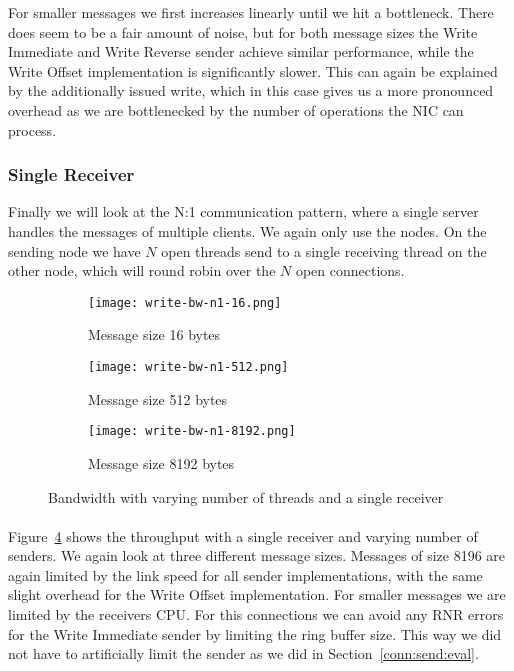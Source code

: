 For smaller messages we  first increases linearly until we hit a bottleneck. There does seem to be a fair amount of noise,
but for both message sizes the Write Immediate and Write Reverse sender achieve similar performance, while the Write Offset
implementation is significantly slower. This can again be explained by the additionally issued write, which in this case 
gives us a more pronounced overhead as we are bottlenecked by the number of operations the NIC can process.




\subsubsection{Single Receiver}
Finally we will look at the N:1 communication pattern, where a single server handles the messages of multiple clients. 
We again only use the nodes. On the sending node we have $N$ open threads send to a single receiving thread on the other node,
which will round robin over the $N$ open connections. 

\begin{figure}[]
  \centering
\begin{subfigure}[b]{0.49\textwidth}
  \centering
  \texttt{[image: write-bw-n1-16.png]}
  \caption{Message size 16 bytes}
  \label{fig:plot-write-bw-n1-16}
\end{subfigure}
\begin{subfigure}[b]{0.49\textwidth}
  \centering
  \texttt{[image: write-bw-n1-512.png]}
  \caption{Message size 512 bytes}
  \label{fig:plot-write-bw-n1-512}
\end{subfigure}
\begin{subfigure}[b]{0.49\textwidth}
  \centering
  \texttt{[image: write-bw-n1-8192.png]}
  \caption{Message size 8192 bytes}
  \label{fig:plot-write-bw-n1-8192}
\end{subfigure}
  \caption{Bandwidth with varying number of threads and a single receiver}
  \label{fig:plot-write-bw-n1}
\end{figure}

\paragraph{} Figure~\ref{fig:plot-write-bw-n1} shows the throughput with a single receiver and varying number of senders.
We again look at three different message sizes. Messages of size 8196 are again limited by the link speed for
all sender implementations, with the same slight overhead for the Write Offset implementation. For smaller messages
we are limited by the receivers CPU. For this connections we can avoid any RNR errors for the Write Immediate sender by
limiting the ring buffer size. This way we did not have to artificially limit the sender as we did in 
Section~\ref{conn:send:eval}.

